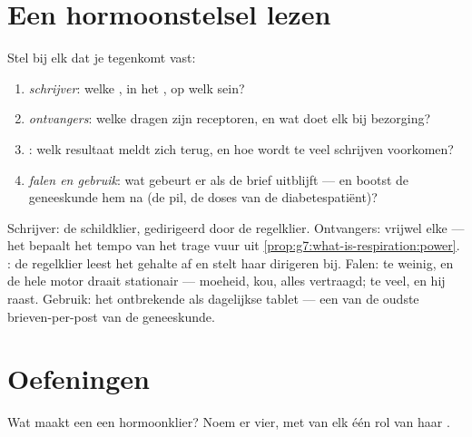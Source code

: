 \section{Een hormoonstelsel lezen}

\begin{method}\label{met:g8:hormonal-communication:read}
Stel bij elk  dat je tegenkomt vast:
\begin{enumerate}
  \item \emph{schrijver}: welke , in het , op welk sein?
  \item \emph{ontvangers}: welke  dragen zijn receptoren, en
        wat doet elk bij bezorging?
  \item \emph{}: welk resultaat meldt zich terug, en hoe
        wordt te veel schrijven voorkomen?
  \item \emph{falen en gebruik}: wat gebeurt er als de brief uitblijft ---
        en bootst de geneeskunde hem na (de pil, de doses van de
        diabetespatiënt)?
\end{enumerate}
\end{method}

\begin{example}\label{ex:g8:hormonal-communication:thyroid}
Schrijver: de schildklier, gedirigeerd door de regelklier. Ontvangers:
vrijwel elke  --- het  bepaalt het tempo van het trage vuur uit
\cref{prop:g7:what-is-respiration:power}. : de regelklier
leest het gehalte af en stelt haar dirigeren bij. Falen: te weinig, en de
hele motor draait stationair --- moeheid, kou, alles vertraagd; te veel, en
hij raast. Gebruik: het ontbrekende  als dagelijkse tablet --- een
van de oudste brieven-per-post van de geneeskunde.
\end{example}

\section{Oefeningen}

\begin{exercise}[$\star$]\label{exo:g8:hormonal-communication:1}
Wat maakt een  een hormoonklier? Noem er vier, met van elk één rol van
haar .
\end{exercise}

